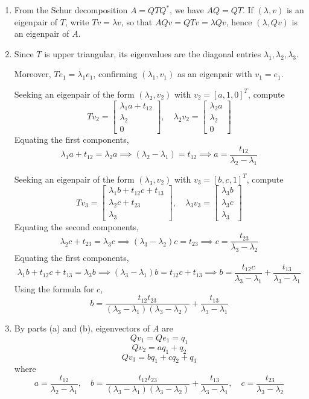 \documentclass{article}
\newcommand{\m}[2][b]{\begin{#1matrix}#2\end{#1matrix}}
\renewcommand{\l}{\lambda}
\newcommand{\imp}{\implies}
\begin{document}
\begin{enumerate}
\begin{enumerate}
		
		
		
		\item From the Schur decomposition $A=QTQ^*$, we have $AQ=QT$. If $(\l,v)$ is an eigenpair of $T$, write $Tv=\l v$, so that $AQv=QTv=\l Qv$, hence $(\l,Qv)$ is an eigenpair of $A$.
		
		
		
		\item Since $T$ is upper triangular, its eigenvalues are the diagonal entries $\l_1,\l_2,\l_3$.
		
		Moreover, $Te_1=\l_1e_1$, confirming $(\l_1,v_1)$ as an eigenpair with $v_1=e_1$.
		
		Seeking an eigenpair of the form $(\l_2,v_2)$ with $v_2=[a,1,0]^T$, compute
		\[Tv_2 = \m{\l_1a+t_{12} \\ \l_2 \\ 0},
		\quad \l_2v_2 = \m{\l_2a \\ \l_2 \\ 0}\]
		Equating the first components,
		\[\l_1a + t_{12} = \l_2a
		\imp (\l_2-\l_1) = t_{12}
		\imp a = \frac{t_{12}}{\l_2-\l_1}\]
		
		Seeking an eigenpair of the form $(\l_3,v_2)$ with $v_3=[b,c,1]^T$, compute
		\[Tv_3 = \m{\l_1b + t_{12}c + t_{13} \\ \l_2c + t_{23} \\ \l_3},
		\quad \l_3v_3 = \m{\l_3b \\ \l_3c \\ \l_3}\]
		Equating the second components,
		\[\l_2c + t_{23} = \l_3c
		\imp (\l_3-\l_2)c = t_{23}
		\imp c = \frac{t_{23}}{\l_3-\l_2}\]
		Equating the first components,
		\[\l_1b + t_{12}c + t_{13} = \l_3b
		\imp (\l_3-\l_1)b = t_{12}c + t_{13}
		\imp b = \frac{t_{12}c}{\l_3-\l_1} + \frac{t_{13}}{\l_3-\l_1}\]
		Using the formula for $c$,
		\[b = \frac{t_{12}t_{23}}{(\l_3-\l_1)(\l_3-\l_2)} + \frac{t_{13}}{\l_3-\l_1}\]
		
		
		
		\item By parts (a) and (b), eigenvectors of $A$ are
		\[Qv_1 = Qe_1 = q_1\]
		\[Qv_2 = aq_1 + q_2\]
		\[Qv_3 = bq_1 + cq_2 + q_3\]
		where
		\[a = \frac{t_{12}}{\l_2-\l_1},
		\quad b = \frac{t_{12}t_{23}}{(\l_3-\l_1)(\l_3-\l_2)} + \frac{t_{13}}{\l_3-\l_1},
		\quad c = \frac{t_{23}}{\l_3-\l_2}\]
		
		
		
	\end{enumerate}
	
	
	
	\pagebreak
	

\end{enumerate}
\end{document}
